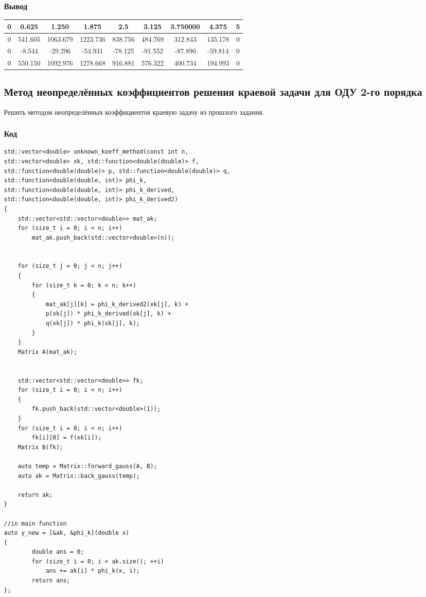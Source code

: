 \documentclass[bachelor, och, pract]{SCWorks}
\begin{document}
\subsubsection{Вывод}

\begin{table}[H]
    \centering
    \begin{tabular}{|c|c|c|c|c|c|c|c|c|}
\hline 0  &   0.625  & 1.250 &   1.875 & 2.5 &      3.125  &   3.750000  &  4.375  &  5 \\\hline
 0   & 541.605  & 1063.679& 1223.736&   838.756  &        484.769  &   312.843 &135.178 &    0\\\hline
0 & -8.544  &  -29.296 &-54.931 &  -78.125&    -91.552  & -87.890  &  -59.814  & 0 \\\hline
0     &     550.150 &1092.976  & 1278.668 & 916.881  &  576.322  &400.734 &  194.993 &0\\\hline
    \end{tabular}
\end{table}


\subsection{Метод неопределённых коэффициентов решения краевой задачи
для ОДУ 2-го порядка}

Решить методом неопределённых коэффициентов краевую задачу из прошлого задания.


\subsubsection{Код}

\begin{lstlisting}
std::vector<double> unknown_koeff_method(const int n, 
std::vector<double> xk, std::function<double(double)> f, 
std::function<double(double)> p, std::function<double(double)> q, 
std::function<double(double, int)> phi_k,
std::function<double(double, int)> phi_k_derived, 
std::function<double(double, int)> phi_k_derived2)
{
    std::vector<std::vector<double>> mat_ak;
    for (size_t i = 0; i < n; i++)
        mat_ak.push_back(std::vector<double>(n));


    for (size_t j = 0; j < n; j++)
    {
        for (size_t k = 0; k < n; k++)
        {
            mat_ak[j][k] = phi_k_derived2(xk[j], k) + 
            p(xk[j]) * phi_k_derived(xk[j], k) +
            q(xk[j]) * phi_k(xk[j], k);
        }
    }
    Matrix A(mat_ak);


    std::vector<std::vector<double>> fk;
    for (size_t i = 0; i < n; i++)
    {
        fk.push_back(std::vector<double>(1));
    }
    for (size_t i = 0; i < n; i++)
        fk[i][0] = f(xk[i]);
    Matrix B(fk);

    auto temp = Matrix::forward_gauss(A, B);
    auto ak = Matrix::back_gauss(temp);
  
    return ak;
}

//in main function
auto y_new = [&ak, &phi_k](double x)
{
        double ans = 0;
        for (size_t i = 0; i < ak.size(); ++i)
            ans += ak[i] * phi_k(x, i);
        return ans;
};
\end{lstlisting}
\end{document}
